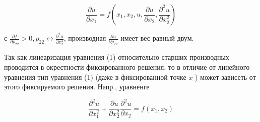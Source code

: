 \documentclass[10pt]{article}
\begin{document}
\[

\frac{\partial u}{\partial x_{1}}=f\left(x_{1}, x_{2}, u, \frac{\partial u}{\partial x_{2}}, \frac{\partial^{2} u}{\partial x_{2}^{2}}\right)

\]



с $\frac{\partial f}{\partial p_{22}}>0, p_{22} \leftrightarrow \frac{\partial^{2} u}{\partial x_{2}^{2}}$, производная $\frac{\partial u}{\partial p_{22}}$ имеет вес равный двум.



Так как линеаризация уравнения (1) относительно старших производных проводится в окрестности фиксированного решения, то в отличие от линейного уравнения тип уравнения (1) (даже в фиксированной точке $x$ ) может зависеть от этого фиксируемого решения. Напр., уравненге



\[

\frac{\partial^{2} u}{\partial x_{1}^{2}}+\frac{\partial u}{\partial x_{2}^{2}} \frac{\partial^{2} u}{\partial x_{2}}=f\left(x_{1}, x_{2}\right)

\]
\end{document}
